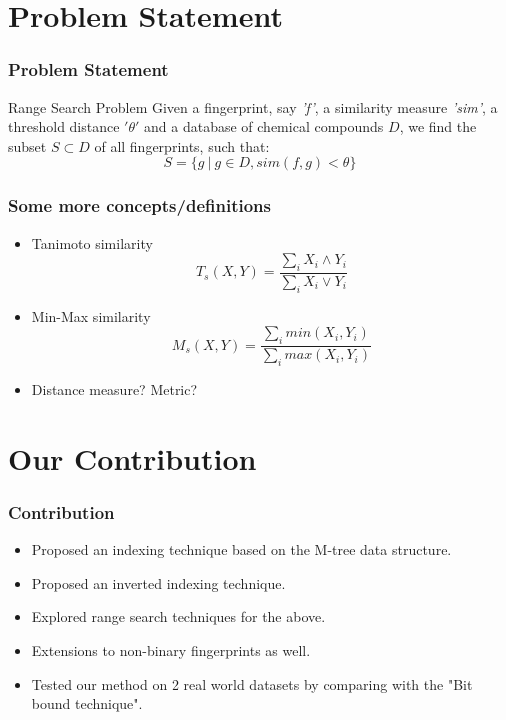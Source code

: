 \documentclass{beamer}
\begin{document}

\section{Problem Statement}
\begin{frame}
\frametitle{Problem Statement}

\begin{block}{Range Search Problem}
Given a fingerprint, say \textit{'f'}, a similarity measure \textit{'sim'}, a threshold distance \textbf{$'\theta'$} and a database of chemical compounds $D$, we find the subset $S \subset D$ of all fingerprints, such that: \\
\begin{equation}
 S= \{g~ |~ g \in D,sim(f,g) < \theta\}
\end{equation}
\end{block}


\end{frame}

\begin{frame}
\frametitle{Some more concepts/definitions}

\begin{itemize}
	\item<1-> Tanimoto similarity
	\begin{equation}
	T_s(X,Y) = \frac{\sum \limits_i X_i \wedge Y_i} {\sum \limits_i X_i \vee Y_i}	
	\end{equation}
	\item<2-> Min-Max similarity
	\begin{equation}
	M_s(X,Y) = \frac{\sum \limits_{i} min(X_i, Y_i)}{\sum \limits_{i} max(X_i, Y_i)}
	\end{equation}	
	\item<3-> Distance measure? Metric?
\end{itemize}

\end{frame}


\section{Our Contribution}

\begin{frame}
\frametitle{Contribution}
\begin{itemize}
	\item<1-> Proposed an indexing technique based on the M-tree data structure.
	\item<2-> Proposed an inverted indexing technique.
	\item<3-> Explored range search techniques for the above.
	\item<4-> Extensions to non-binary fingerprints as well.
	\item<5-> Tested our method on 2 real world datasets by comparing with the "Bit bound technique". 
	  
\end{itemize}

\end{frame}
\end{document}
